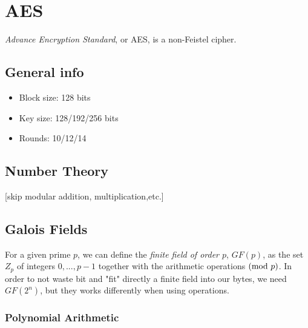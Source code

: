 \section{AES}
\textit{Advance Encryption Standard}, or AES, is a non-Feistel cipher.
\subsection{General info}
\begin{itemize}
    \item Block size: 128 bits
    \item Key size: 128/192/256 bits
    \item Rounds: 10/12/14
\end{itemize}
\subsection{Number Theory}
{\color{blue} [skip modular addition, multiplication,etc.]}

\subsection{Galois Fields}
For a given prime $p$, we can define the \textit{finite field of order $p$}, $GF(p)$, as the set $Z_p$ of integers ${0,...,p-1}$ together with the arithmetic operations $(\mathrm{mod}\ p)$.
In order to not waste bit and "fit" directly a finite field into our bytes, we need $GF(2^n)$, but they works differently when using operations.
\subsubsection{Polynomial Arithmetic}

